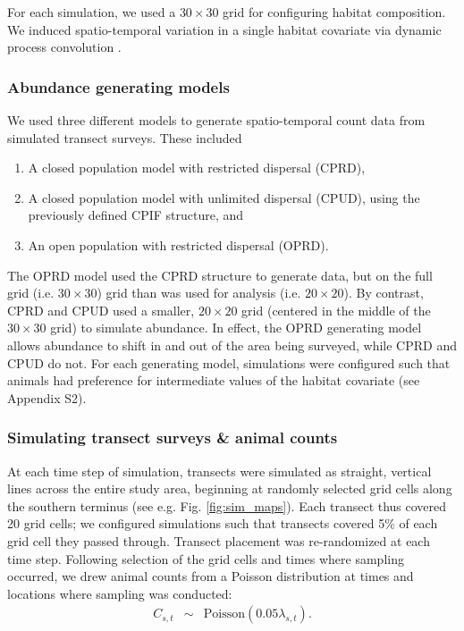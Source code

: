 \documentclass[times,mee,doublespace,]{besauth2}
\begin{document}
For each simulation, we used a $30 \times 30$ grid for configuring habitat composition.  We induced spatio-temporal variation in a single habitat covariate via dynamic process convolution \citep[][; e.g. Fig. \ref{fig:sim_maps}]{CalderEtAl2002}.

\subsubsection{Abundance generating models}

We used three different models to generate spatio-temporal count data from simulated transect surveys.  These included
\begin{enumerate}
   \item  A closed population model with restricted dispersal (CPRD),
   \item A closed population model with unlimited dispersal (CPUD), using the previously defined CPIF structure, and
   \item An open population with restricted dispersal (OPRD).
\end{enumerate}
The OPRD model used the CPRD structure to generate data, but on the full grid (i.e. $30 \times 30$) grid than was used for analysis (i.e. $20 \times 20$).  By contrast, CPRD and CPUD used a smaller, $20 \times 20$ grid (centered in the middle of the $30 \times 30$ grid) to simulate abundance.  In effect, the OPRD generating model allows abundance to shift in and out of the area being surveyed, while CPRD and CPUD do not.  For each generating model, simulations were configured such that animals had preference for intermediate values of the habitat covariate (see Appendix S2).

\subsubsection{Simulating transect surveys \& animal counts}

At each time step of simulation, transects were simulated as straight, vertical lines across the entire study area, beginning at randomly selected grid cells along the southern terminus (see e.g. Fig. \ref{fig:sim_maps}).  Each transect thus covered 20 grid cells; we configured simulations such that transects covered 5\% of each grid cell they passed through.  Transect placement was re-randomized at each time step.  Following selection of the grid cells and times where sampling occurred, we drew animal counts from a Poisson distribution at times and locations where sampling was conducted:
\begin{eqnarray*}
  C_{s,t} & \sim & \text{Poisson}(0.05 \lambda_{s,t}).
\end{eqnarray*}
\end{document}
